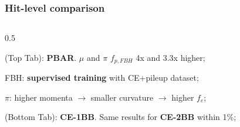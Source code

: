 \documentclass{beamer}
\begin{document}
\begin{frame}
    \frametitle{Hit-level comparison}
    \vspace{-3mm}
    \begin{columns}
    \begin{column}{0.5\framewidth}
    \vspace{-2mm}
        \setlength{\leftmargini}{0.7em}
\begin{itemize}
{\small
    \item (Top Tab): \textbf{PBAR}. $\mu$ and $\pi$ $f_{p,FBH}$ 4x and 3.3x higher;
      \vspace{-0.5mm}
      \item FBH: \textbf{supervised training} with CE+pileup dataset;
      \vspace{-0.5mm}
      \item $\pi$: higher momenta $\rightarrow$ smaller curvature $\rightarrow$ higher $f_e$;
      \vspace{-0.5mm}
      \item (Bottom Tab): \textbf{CE-1BB}. Same results for \textbf{CE-2BB} within 1\%;

}
\end{itemize}
\end{column}
\end{columns}
\end{frame}
\end{document}
